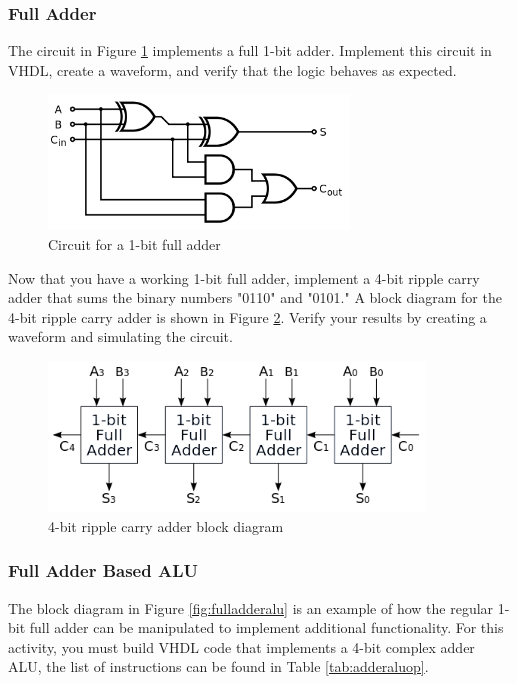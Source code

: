 \subsubsection{Full Adder}
The circuit in Figure \ref{fig:fulladder} implements a full 1-bit adder. Implement this circuit in VHDL, create a waveform, and verify that the logic behaves as expected. 

\begin{figure}[H]
	\centering
	\includegraphics[width=80mm]{Lab3/figures/fulladder.png}
	\caption{Circuit for a 1-bit full adder}
	\label{fig:fulladder}
\end{figure}

Now that you have a working 1-bit full adder, implement a 4-bit ripple carry adder that sums the binary numbers "0110" and "0101." A block diagram for the 4-bit ripple carry adder is shown in Figure \ref{fig:fourbitripple}. Verify your results by creating a waveform and simulating the circuit.

\begin{figure}[H]
	\centering
	\includegraphics[width=100mm]{Lab3/figures/fourbitripple.png}
	\caption{4-bit ripple carry adder block diagram}
	\label{fig:fourbitripple}
\end{figure}

\subsubsection{Full Adder Based ALU}
The block diagram in Figure \ref{fig:fulladderalu} is an example of how the regular 1-bit full adder can be manipulated to implement additional functionality. For this activity, you must build VHDL code that implements a 4-bit complex adder ALU, the list of instructions can be found in Table \ref{tab:adderaluop}.

